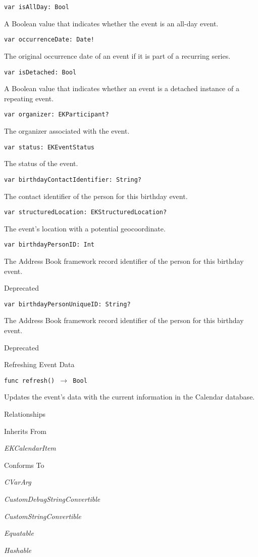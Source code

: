 \documentclass{article}
\begin{document}
\texttt{var isAllDay: Bool}

A Boolean value that indicates whether the event is an all-day event.

\texttt{var occurrenceDate: Date!}

The original occurrence date of an event if it is part of a recurring series.

\texttt{var isDetached: Bool}

A Boolean value that indicates whether an event is a detached instance of a repeating event.

\texttt{var organizer: EKParticipant?}

The organizer associated with the event.

\texttt{var status: EKEventStatus}

The status of the event.

\texttt{var birthdayContactIdentifier: String?}

The contact identifier of the person for this birthday event.

\texttt{var structuredLocation: EKStructuredLocation?}

The event's location with a potential geocoordinate.

\texttt{var birthdayPersonID: Int}

The Address Book framework record identifier of the person for this birthday event.

Deprecated

\texttt{var birthdayPersonUniqueID: String?}

The Address Book framework record identifier of the person for this birthday event.

Deprecated

Refreshing Event Data

\texttt{func refresh() $\rightarrow$ Bool}

Updates the event's data with the current information in the Calendar database.

Relationships

Inherits From

\textit{EKCalendarItem}

Conforms To

\textit{CVarArg}

\textit{CustomDebugStringConvertible}

\textit{CustomStringConvertible}

\textit{Equatable}

\textit{Hashable}
\end{document}
